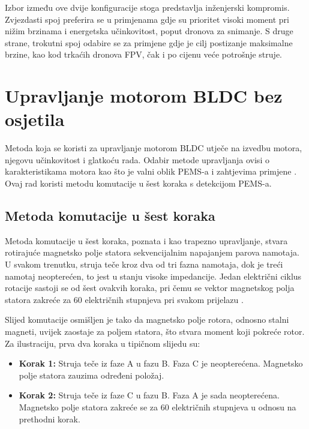 \documentclass[diplomskirad]{fer}
\begin{document}
Izbor između ove dvije konfiguracije stoga predstavlja inženjerski kompromis.
Zvjezdasti spoj preferira se u primjenama gdje su prioritet visoki moment pri
nižim brzinama i energetska učinkovitost, poput dronova za snimanje. S druge
strane, trokutni spoj odabire se za primjene gdje je cilj postizanje maksimalne
brzine, kao kod trkaćih dronova FPV, čak i po cijenu veće potrošnje struje.

\newpage

\chapter{Upravljanje motorom BLDC bez osjetila}
\label{pog:bldc_upravljanje_bez_senzora}

Metoda koja se koristi za upravljanje motorom BLDC utječe na izvedbu motora,
njegovu učinkovitost i glatkoću rada. Odabir metode upravljanja ovisi o
karakteristikama motora kao što je valni oblik PEMS-a i zahtjevima primjene
\cite{cite:bldc}. Ovaj rad koristi metodu komutacije u šest koraka s detekcijom
PEMS-a.

\section{Metoda komutacije u šest koraka}
\label{sec:six-step}

Metoda komutacije u šest koraka, poznata i kao trapezno upravljanje, stvara
rotirajuće magnetsko polje statora sekvencijalnim napajanjem parova namotaja. U
svakom trenutku, struja teče kroz dva od tri fazna namotaja, dok je treći
namotaj neopterećen, to jest u stanju visoke impedancije. Jedan električni
ciklus rotacije sastoji se od šest ovakvih koraka, pri čemu se vektor
magnetskog polja statora zakreće za 60 električnih stupnjeva pri svakom
prijelazu \cite{cite:bldc, NXP_AN2355}.

Slijed komutacije osmišljen je tako da magnetsko polje rotora, odnosno stalni
magneti, uvijek zaostaje za poljem statora, što stvara moment koji pokreće
rotor. Za ilustraciju, prva dva koraka u tipičnom slijedu su:

\begin{itemize}
	\item \textbf{Korak 1:} Struja teče iz faze A u fazu B. Faza C je neopterećena. Magnetsko polje statora zauzima određeni položaj.

	\item \textbf{Korak 2:} Struja teče iz faze C u fazu B. Faza A je sada neopterećena. Magnetsko polje statora zakreće se za 60 električnih stupnjeva u odnosu na prethodni korak.
\end{itemize}
\end{document}
